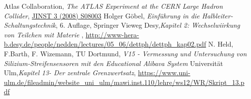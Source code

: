 \begin{thebibliography}{99}
 Atlas Collaboration, \textit{The {ATLAS} Experiment at the {CERN} Large Hadron Collider}, \href{https://iopscience.iop.org/article/10.1088/1748-0221/3/08/S08003}{JINST 3 (2008) S08003}
 Holger Göbel, \textit{Einführung in die Halbleiter-Schaltungstechnik}, 6. Auflage, Springer Vieweg
 Desy,\textit{Kapitel 2: Wechselwiirkung von Teilchen mit Materie} , \url{http://www-hera-b.desy.de/people/nedden/lectures/05_06/dettph/dettph_kap02.pdf}
 N. Held, F.Barth, F. Wizemann, TU Dortmund, \textit{V15 - Vermessung und Untersuchung von Silizium-Streifensensoren mit den Educational Alibava System}
 Universität Ulm,\textit{Kapitel 13- Der zentrale Grenzwertsatz}, \url{https://www.uni-ulm.de/fileadmin/website_uni_ulm/mawi.inst.110/lehre/ws12/WR/Skript_13.pdf}
\end{thebibliography}
